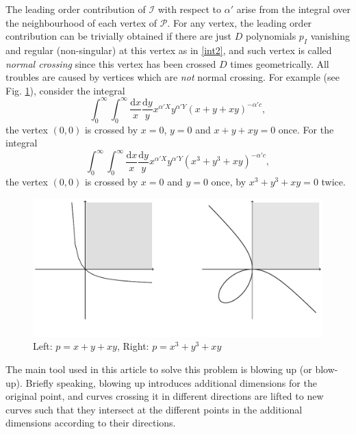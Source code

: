 \documentclass[12pt]{article}
\theoremstyle{definition}
\theoremstyle{plain}
\newcommand{\dif}{\mathrm{d}} %
\begin{document}
The leading order contribution of $\mathcal{I}$ with respect to $\alpha'$ arise from the integral over the neighbourhood of each vertex of $\mathcal{P}$. For any vertex, the leading order contribution can be trivially obtained if there are just $D$ polynomials $p_{I}$ vanishing and regular (non-singular) at this vertex as in \eqref{int2}, and such vertex is called {\it{normal crossing}} since this vertex has been crossed $D$ times geometrically. All troubles are caused by vertices which are {\it not} normal crossing. For example (see Fig. \ref{fig_1}), consider the integral 
\begin{equation}\label{exam:1}
	\int_0^\infty \int_0^\infty \frac{\dif x}{x}\frac{\dif y}{y}x^{\alpha' X}
	y^{\alpha' Y}(x+y+ xy)^{-\alpha' c},
\end{equation}
the vertex $(0,0)$ is crossed by $x=0$, $y=0$ and $x+y+xy=0$ once. 
For the integral
\begin{equation}\label{exam:2}
\int_0^\infty \int_0^\infty \frac{\dif x}{x}\frac{\dif y}{y}x^{\alpha' X}
y^{\alpha' Y}(x^3+y^3+ xy)^{-\alpha' c},
\end{equation}
the vertex $(0,0)$ is crossed by $x=0$ and $y=0$ once, by $x^3+y^3+xy=0$ twice. 

\begin{figure}[h]
\begin{center}
\includegraphics[scale=0.75]{fig_1.pdf}
\end{center}
\vspace{-5ex}
\caption{Left: $p=x+y+xy$, Right: $p=x^3+y^3+xy$}
\label{fig_1}
\end{figure}

The main tool used in this article to solve this problem is blowing up (or blow-up).
Briefly speaking, blowing up introduces additional dimensions for the original point,
and curves crossing it in different directions are lifted to new curves such that they intersect at the different points in the additional dimensions according to their directions.
\end{document}
